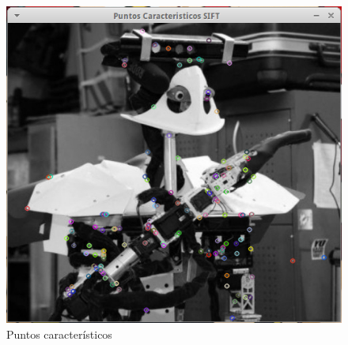 \begin{figure}[h]
			\centering
				\includegraphics[scale=1]{img/KeyPoints.png}
			\caption{Puntos característicos }
\end{figure}



























